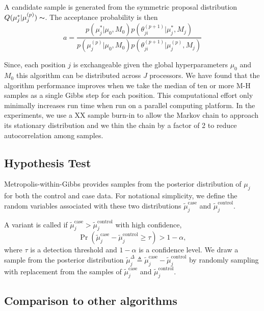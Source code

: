 \documentclass[11pt,reqno]{amsart}
\begin{document}
A candidate sample is generated from the symmetric proposal distribution $Q(\mu_j^* | \mu_j^{(p)}) \thicksim $. The acceptance probability is then
\begin{equation}
	a = \frac{ p(\mu_j^* | \mu_0, M_0) p(\theta^{(p+1)}_{ji} | \mu_j^*, M_j) } {p(\mu_j^{(p)} | \mu_0, M_0) p(\theta^{(p+1)}_{ji} | \mu_j^{(p)}, M_j)}
\end{equation}

Since, each position $j$ is exchangeable given the global hyperparameters $\mu_0$ and $M_0$ this algorithm can be distributed across $J$ processors. We have found that the algorithm performance improves when we take the median of ten or more M-H samples as a single Gibbs step for each position. This computational effort only minimally increases run time when run on a parallel computing platform. In the experiments, we use a XX sample burn-in to allow the Markov chain to approach its stationary distribution and we thin the chain by a factor of 2 to reduce autocorrelation among samples.

\subsection{Hypothesis Test}
Metropolis-within-Gibbs provides samples from the posterior distribution of $\mu_j$ for both the control and case data. For notational simplicity, we define the random variables associated with these two distributions $\tilde{\mu}_j^{\text{case}}$ and $\tilde{\mu}_j^{\text{control}}$.

A variant is called if $\tilde{\mu}_j^{\text{case}} > \tilde{\mu}_j^{\text{control}}$ with high confidence,
\begin{equation}
	\Pr( \tilde{\mu}_j^{\text{case}} - \tilde{\mu}_j^{\text{control}} \geq \tau ) > 1-\alpha,
\end{equation}
where $\tau$ is a detection threshold and $1-\alpha$ is a confidence level. We draw a sample from the posterior distribution $\tilde{\mu}_j^{\Delta} \triangleq \tilde{\mu}_j^{\text{case}} - \tilde{\mu}_j^{\text{control}}$ by randomly sampling with replacement from the samples of $\tilde{\mu}_j^{\text{case}}$ and $\tilde{\mu}_j^{\text{control}}$.

\subsection{Comparison to other algorithms}
\end{document}
